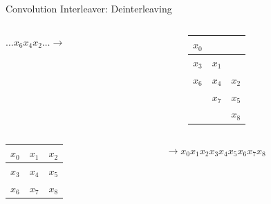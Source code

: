 \documentclass[aspectratio=169]{beamer}
\begin{document}
\begin{frame}{Convolution Interleaver: Deinterleaving}
    \begin{columns}[c]
    \begin{column}{1cm}
        $\ldots x_6 x_4 x_2 \ldots \to$
    \end{column}
    \begin{column}{5cm}
    \begin{table}
        \centering
        \begin{tabular}{|c|c|c|}
            \hline
            $x_0$ &   &   \\ \hline
            $x_3$ & $x_1$ &   \\ \hline
            $x_6$ & $x_4$ & $x_2$ \\ \hline
              & $x_7$ & $x_5$ \\ \hline
              &   & $x_8$ \\ \hline
        \end{tabular}
    \end{table}
    \end{column}
    \end{columns}

    \begin{columns}[c]
    \begin{column}{1cm}
    \begin{table}
        \centering
        \begin{tabular}{|c|c|c|}
            \hline
            $x_0$ & $x_1$ & $x_2$ \\ \hline
            $x_3$ & $x_4$ & $x_5$ \\ \hline
            $x_6$ & $x_7$ & $x_8$ \\ \hline
        \end{tabular}
    \end{table}
    \end{column}
    \hfill
    \begin{column}{5cm}
        $\to x_0 x_1 x_2 x_3 x_4 x_5 x_6 x_7 x_8$
    \end{column}
    \end{columns}
\end{frame}
\end{document}
